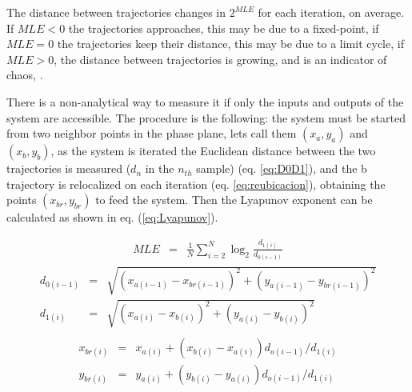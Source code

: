 The distance between trajectories changes in $2^{MLE}$ for each
iteration, on average. If $MLE<0$ the trajectories approaches,
this may be due to a fixed-point, if $MLE=0$ the trajectories keep
their distance, this may be due to a limit cycle, if $MLE>0$, the
distance between trajectories is growing, and is an indicator of
chaos, \cite{Sprott2003}.

There is a non-analytical way to measure it if only the inputs and
outputs of the system are accessible. The procedure is the
following: the system must be started from two neighbor points in
the phase plane, lets call them $(x_a,y_a)$ and $(x_b,y_b)$, as
the system is iterated the Euclidean distance between the two
trajectories is measured ($d_n$ in the $n_{th}$ sample) (eq.
\ref{eq:D0D1}), and the b trajectory is relocalized on each
iteration  (eq. \ref{eq:reubicacion}), obtaining the points
$(x_{br},y_{br})$ to feed the system. Then the Lyapunov exponent
can be calculated as shown in eq. (\ref{eq:Lyapunov}).

\begin{eqnarray}\label{eq:Lyapunov}
    MLE &=& \frac{1}{N} \sum_{i=2}^{N} \log_2{\frac{d_{1(i)}}{d_{0(i-1)}}}
\end{eqnarray}
\begin{eqnarray}\label{eq:D0D1}
    d_{0(i-1)}&=& \sqrt{(x_{a(i-1)}-x_{br(i-1)})^2+(y_{a(i-1)}-y_{br(i-1)})^2}\nonumber\\
    d_{1(i)}&=& \sqrt{(x_{a(i)}-x_{b(i)})^2+(y_{a(i)}-y_{b(i)})^2}\\
\nonumber
\end{eqnarray}
\begin{eqnarray}\label{eq:reubicacion}
    x_{br(i)}&=& x_{a(i)}+(x_{b(i)}-x_{a(i)})d_{o(i-1)}/d_{1(i)} \nonumber\\
    y_{br(i)}&=& y_{a(i)}+(y_{b(i)}-y_{a(i)})d_{o(i-1)}/d_{1(i)}
\end{eqnarray}


